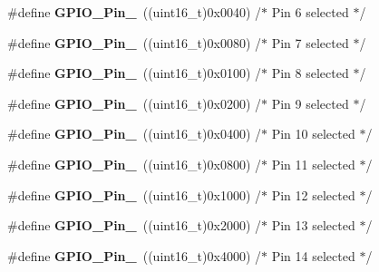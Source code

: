 \begin{DoxyCompactItemize}
\#define {\bfseries G\+P\+I\+O\+\_\+\+Pin\+\_}~((uint16\+\_\+t)0x0040)  /$\ast$ Pin 6 selected $\ast$/
\item 
\mbox{\label{group___g_p_i_o__pins__define_ga7346b6ce5507bd28a7a79e7dcc816c08}} 
\#define {\bfseries G\+P\+I\+O\+\_\+\+Pin\+\_}~((uint16\+\_\+t)0x0080)  /$\ast$ Pin 7 selected $\ast$/
\item 
\mbox{\label{group___g_p_i_o__pins__define_gac891f0984dc64af3567577fbf13ab304}} 
\#define {\bfseries G\+P\+I\+O\+\_\+\+Pin\+\_}~((uint16\+\_\+t)0x0100)  /$\ast$ Pin 8 selected $\ast$/
\item 
\mbox{\label{group___g_p_i_o__pins__define_gaad1891082d5d6bcac06c2729a9fdd2f0}} 
\#define {\bfseries G\+P\+I\+O\+\_\+\+Pin\+\_}~((uint16\+\_\+t)0x0200)  /$\ast$ Pin 9 selected $\ast$/
\item 
\mbox{\label{group___g_p_i_o__pins__define_ga726af6407ba60ac60f02057227c2d348}} 
\#define {\bfseries G\+P\+I\+O\+\_\+\+Pin\+\_}~((uint16\+\_\+t)0x0400)  /$\ast$ Pin 10 selected $\ast$/
\item 
\mbox{\label{group___g_p_i_o__pins__define_ga5139d5bc3d15784ae7794ed2ae1ff767}} 
\#define {\bfseries G\+P\+I\+O\+\_\+\+Pin\+\_}~((uint16\+\_\+t)0x0800)  /$\ast$ Pin 11 selected $\ast$/
\item 
\mbox{\label{group___g_p_i_o__pins__define_gada91257dcaab2c86f75fbd8e4b52b98c}} 
\#define {\bfseries G\+P\+I\+O\+\_\+\+Pin\+\_}~((uint16\+\_\+t)0x1000)  /$\ast$ Pin 12 selected $\ast$/
\item 
\mbox{\label{group___g_p_i_o__pins__define_ga4155a41c433f3657b9c79cfbd4240966}} 
\#define {\bfseries G\+P\+I\+O\+\_\+\+Pin\+\_}~((uint16\+\_\+t)0x2000)  /$\ast$ Pin 13 selected $\ast$/
\item 
\mbox{\label{group___g_p_i_o__pins__define_ga21cd1d89c0c061a6f09c5a842610bee5}} 
\#define {\bfseries G\+P\+I\+O\+\_\+\+Pin\+\_}~((uint16\+\_\+t)0x4000)  /$\ast$ Pin 14 selected $\ast$/

\end{DoxyCompactItemize}
